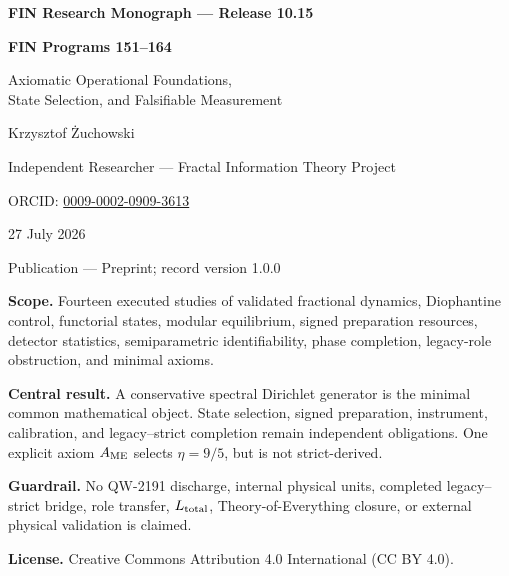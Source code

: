\documentclass[11pt,a4paper,openany]{report}
\begin{document}
\hypersetup{pageanchor=false}
\begin{titlepage}
\centering
\vspace*{8mm}
{\Large\bfseries FIN Research Monograph --- Release 10.15\par}
\vspace{10mm}
{\Huge\bfseries FIN Programs 151--164\par}
\vspace{6mm}
{\Large Axiomatic Operational Foundations,\\
State Selection, and Falsifiable Measurement\par}
\vspace{16mm}
{\Large Krzysztof \.Zuchowski\par}
\vspace{2mm}
{\normalsize Independent Researcher --- Fractal Information Theory Project\par}
\vspace{2mm}
{\normalsize ORCID: \href{https://orcid.org/0009-0002-0909-3613}{0009-0002-0909-3613}\par}
\vspace{10mm}
{\large 27 July 2026\par}
{\normalsize Publication --- Preprint; record version 1.0.0\par}
\vfill
\begin{minipage}{0.88\textwidth}
\small
\textbf{Scope.} Fourteen executed studies of validated fractional dynamics,
Diophantine control, functorial states, modular equilibrium, signed
preparation resources, detector statistics, semiparametric identifiability,
phase completion, legacy-role obstruction, and minimal axioms.

\medskip
\textbf{Central result.} A conservative spectral Dirichlet generator is the
minimal common mathematical object. State selection, signed preparation,
instrument, calibration, and legacy--strict completion remain independent
obligations. One explicit axiom \(A_{\rm ME}\) selects \(\eta=9/5\), but is
not strict-derived.

\medskip
\textbf{Guardrail.} No QW-2191 discharge, internal physical units, completed
legacy--strict bridge, role transfer, \(L_{\rm total}\), Theory-of-Everything
closure, or external physical validation is claimed.

\medskip
\textbf{License.} Creative Commons Attribution 4.0 International (CC BY 4.0).
\end{minipage}
\vfill
\end{titlepage}
\hypersetup{pageanchor=true}
\end{document}
